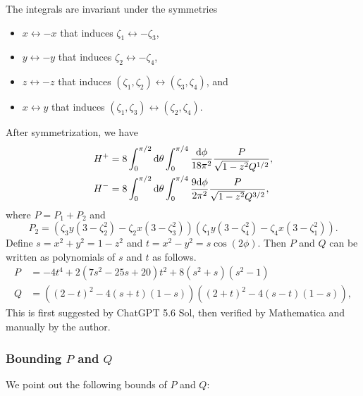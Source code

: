 \documentclass[a4paper]{amsart}
\newcommand{\dd}{{\rm d}}
\theoremstyle{plain} %
\theoremstyle{definition} %
\theoremstyle{remark}
\begin{document}
The integrals are invariant under the symmetries
\begin{itemize}
	\item $x \leftrightarrow -x$ that induces $\zeta_1 \leftrightarrow -\zeta_3$,
	\item $y \leftrightarrow -y$ that induces $\zeta_2 \leftrightarrow -\zeta_4$,
	\item $z \leftrightarrow -z$ that induces $(\zeta_1, \zeta_2) \leftrightarrow (\zeta_3, \zeta_4)$, and
	\item $x \leftrightarrow y$ that induces $(\zeta_1, \zeta_3) \leftrightarrow (\zeta_2, \zeta_4)$.
\end{itemize}
After symmetrization, we have
\begin{align*}
	H^+ &= 8 \int_0^{\pi/2} \dd\theta \int_0^{\pi/4}
	\frac{\dd\phi}{18\pi^2} \frac{P}{\sqrt{1-z^2} Q^{1/2}},\\
	H^- &= 8 \int_0^{\pi/2} \dd\theta \int_0^{\pi/4}
	\frac{9 \dd\phi}{2\pi^2} \frac{P}{\sqrt{1-z^2} Q^{3/2}},
\end{align*}
where $P=P_1 + P_2$ and
\[
	P_2 = (\zeta_3y(3-\zeta_2^2) - \zeta_2x(3-\zeta_3^2))(\zeta_1y(3-\zeta_4^2)-\zeta_4x(3-\zeta_1^2)).
\]
Define $s = x^2 + y^2 = 1-z^2$ and $t = x^2 - y^2 = s \cos(2\phi)$.  Then $P$
and $Q$ can be written as polynomials of $s$ and $t$ as follows.
\begin{align*}
	P &= -4t^4 + 2 (7 s^2 - 25 s + 20) t^2 + 8 (s^2+s)(s^2-1)\\
	Q &= ((2-t)^2-4(s+t)(1-s))((2+t)^2-4(s-t)(1-s)),
\end{align*}
This is first suggested by ChatGPT 5.6 Sol, then verified by Mathematica and
manually by the author.

\subsubsection{Bounding $P$ and $Q$}

We point out the following bounds of $P$ and $Q$:
\end{document}
